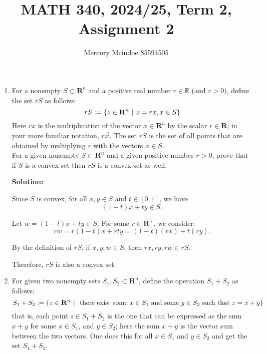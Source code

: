 \documentclass[11pt]{article}
\title{MATH 340, 2024/25, Term 2, Assignment 2}
\author{Mercury Mcindoe 85594505}
\newenvironment{solution}
  {\par\noindent\textbf{Solution:}\par}
  {\par}
\begin{document}
\maketitle 
\thispagestyle{empty}

\begin{enumerate}[start=3]
  \item For a nonempty $S \subset \mathbf{R}^n$ and a positive real number $r \in \mathbb{R}$ (and $r > 0$),
    define the set $rS$ as follows:
    $$rS := \left\{ z \in \mathbf{R}^n \hspace{.05in} \vert \hspace{.05in} z = rx, x \in S \right\}$$
    Here $rx$ is the multiplication of the vector $x \in \mathbf{R}^n$ by the scalar $r \in \mathbf{R}$; in your more
    familiar notation, $r\vec{x}$. The set $rS$ is the set of all points that are obtained by multiplying
    $r$ with the vectors $x \in S$. \\ 
    For a given nonempty $S \subset \mathbf{R}^n$ and a given positive number $r>0$, prove that if $S$ is
    a convex set then $rS$ is a convex set as well.
    \begin{solution}
      Since $S$ is convex, for all $x, y \in S$ and $t \in [0,1]$, we have 
      $$(1-t)x + ty \in S.$$
      
      Let $w = (1-t)x + ty \in S$. For some $r \in \mathbf{R}^+$, we consider:
      $$rw = r(1-t)x + rty = (1-t)(rx) + t(ry).$$

      By the definition of $rS$, if $x, y, w \in S$, then $rx, ry, rw \in rS$. 

      Therefore, $rS$ is also a convex set.
    \end{solution}

  \item For given two nonempty sets $S_1,S_2 \subset \mathbf{R}^n$, define the operation $S_1+S_2$ as follows:
    $$S_1+S_2 := \left\{ z \in \mathbf{R}^n \hspace{.05in} \vert \hspace{.05in} \text{ there exist some } x \in S_1 \text{ and some } y \in S_2 \text{ such that } z =x+y \right\}$$
    that is, each point $z \in S_1 + S_2$ is the one that can be expressed as the sum $x+y$ for some $x \in S_1$,
    and $y \in S_2$; here the sum $x+y$ is the vector sum between the two vectors. One does this for 
    all $x \in S_1$ and $y \in S_2$ and get the set $S_1 + S_2$.


\end{enumerate}
\end{document}
